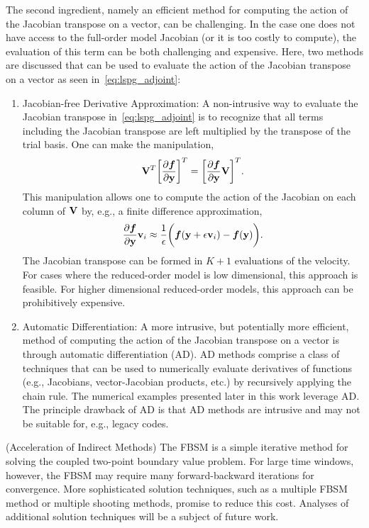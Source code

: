 The second ingredient, namely an efficient method for computing the action of the Jacobian transpose on a vector, can be challenging. 
In the case one does not have access to the full-order model Jacobian (or it is too costly to compute), the evaluation of this term can be both challenging and expensive. Here, two methods are discussed that can be used to evaluate the action of the Jacobian transpose on a vector as seen in~\eqref{eq:lspg_adjoint}:
\begin{enumerate}
\item Jacobian-free Derivative Approximation: A non-intrusive way to evaluate the Jacobian transpose in~\eqref{eq:lspg_adjoint} is to recognize that all terms including the Jacobian transpose are left multiplied by the transpose of the trial basis. One can make the manipulation,
$$\mathbf {V}^T \bigg[\frac{\partial \boldsymbol f}{\partial \mathbf{y}} \bigg]^T = \bigg[  \frac{\partial \boldsymbol f}{\partial \mathbf{y}} \mathbf {V} \bigg]^T.$$
This manipulation allows one to compute the action of the Jacobian on each column of $\mathbf {V}$ by, e.g., a finite difference approximation,
$$\frac{\partial \boldsymbol f}{\partial \mathbf{y}} \mathbf{v}_i \approx \frac{1}{\epsilon}\bigg( \boldsymbol f(\mathbf{y} + \epsilon \mathbf{v}_i) - \boldsymbol f(\mathbf{y}) \bigg).$$
The Jacobian transpose can be formed in $K+1$ evaluations of the velocity. For cases where the reduced-order model is low dimensional, this approach is feasible. For higher dimensional reduced-order models, this approach can be prohibitively expensive.

\item Automatic Differentiation: A more intrusive, but potentially more efficient, method of computing the action of the Jacobian transpose on a vector is through automatic differentiation (AD). AD methods comprise a class of techniques that can be used to numerically evaluate derivatives of functions (e.g., Jacobians, vector-Jacobian products, etc.) by recursively applying the chain rule. The numerical examples presented later in this work leverage AD. The principle drawback of AD is that AD methods are intrusive and may not be suitable for, e.g., legacy codes.  
\end{enumerate}

\begin{remark}\label{remark:fbsm}(Acceleration of Indirect Methods)
The FBSM is a simple iterative method for solving the coupled two-point boundary value problem. For large time windows, however, the FBSM may require many 
forward-backward iterations for convergence. More sophisticated solution techniques, such as a multiple FBSM method or multiple shooting methods, promise 
to reduce this cost. Analyses of additional solution techniques will be a subject of future work.
\end{remark}

